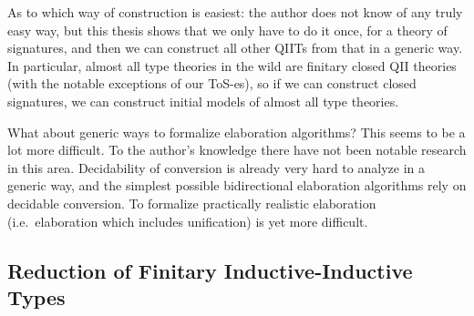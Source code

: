 \documentclass[12pt,a4paper,twoside,openany]{book}
\theoremstyle{remark}
\theoremstyle{definition}
\theoremstyle{theorem}
\begin{document}
As to which way of construction is easiest: the author does not know of any
truly easy way, but this thesis shows that we only have to do it once, for a
theory of signatures, and then we can construct all other QIITs from that in a
generic way. In particular, almost all type theories in the wild are finitary closed QII
theories (with the notable exceptions of our ToS-es), so if we can construct
closed signatures, we can construct initial models of almost all type theories.

What about generic ways to formalize elaboration algorithms? This seems to be a
lot more difficult. To the author's knowledge there have not been notable
research in this area. Decidability of conversion is already very hard to
analyze in a generic way, and the simplest possible bidirectional elaboration
algorithms rely on decidable conversion. To formalize practically realistic
elaboration (i.e.\ elaboration which includes unification) is yet more
difficult.

\subsection{Reduction of Finitary Inductive-Inductive Types}
\end{document}
